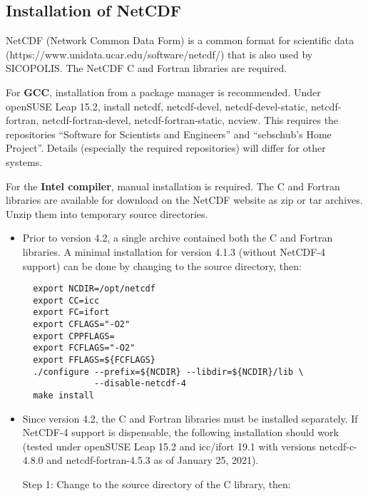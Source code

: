 \documentclass[12pt,a4paper]{article}
\begin{document}
\begin{appendix}

\section{Installation of NetCDF}
\label{sect_install_nc}

NetCDF (Network Common Data Form) is a common format for scientific data
\linebreak{}
(https://www.unidata.ucar.edu/software/netcdf/) that is also used by SICOPOLIS. The NetCDF C and Fortran libraries are required.

For \textbf{GCC}, installation from a package manager is recommended. Under openSUSE Leap 15.2, install netcdf, netcdf-devel, netcdf-devel-static, netcdf-fortran, netcdf-fortran-devel, netcdf-fortran-static, ncview. This requires the repositories ``Software for Scientists and Engineers'' and ``sebschub's Home Project''. Details (especially the required repositories) will differ for other systems.

For the \textbf{Intel compiler}, manual installation is required. The C and Fortran libraries are available for download on the NetCDF website as zip or tar archives. Unzip them into temporary source directories. 

\begin{itemize}

\item Prior to version 4.2, a single archive contained both the C and Fortran libraries. A minimal installation for version 4.1.3 (without NetCDF-4 support) can be done by changing to the source directory, then:

\begin{verbatim}
  export NCDIR=/opt/netcdf
  export CC=icc
  export FC=ifort
  export CFLAGS="-O2"
  export CPPFLAGS=
  export FCFLAGS="-O2"
  export FFLAGS=${FCFLAGS}
  ./configure --prefix=${NCDIR} --libdir=${NCDIR}/lib \
              --disable-netcdf-4
  make install
\end{verbatim}

\item Since version 4.2, the C and Fortran libraries must be installed separately. If Net\-CDF-4 support is dispensable, the following installation should work (tested under openSUSE Leap 15.2 and icc/ifort 19.1 with versions netcdf-c-4.8.0 and netcdf-fortran-4.5.3 as of January 25, 2021).

Step 1: Change to the source directory of the C library, then:


\end{itemize}
\end{appendix}
\end{document}
